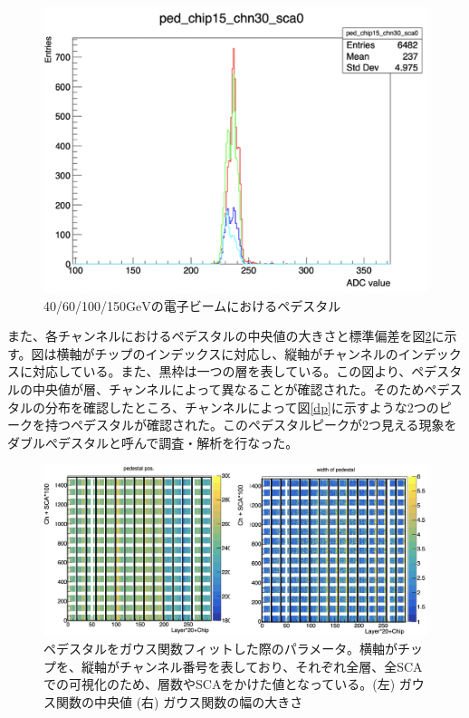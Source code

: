 \begin{figure}[H]
\begin{center}
 \includegraphics[keepaspectratio, scale=0.3]
 	{Figure/Beamtest/pedestal.png}
 		\caption{40/60/100/150$\mathrm{GeV}$の電子ビームにおけるペデスタル}
		\label{pedestal}
\end{center}
\end{figure}
また、各チャンネルにおけるペデスタルの中央値の大きさと標準偏差を図\ref{means}に示す。図は横軸がチップのインデックスに対応し、縦軸がチャンネルのインデックスに対応している。また、黒枠は一つの層を表している。この図より、ペデスタルの中央値が層、チャンネルによって異なることが確認された。そのためぺデスタルの分布を確認したところ、チャンネルによって図\ref{dp}に示すような2つのピークを持つペデスタルが確認された。このペデスタルピークが2つ見える現象をダブルぺデスタルと呼んで調査・解析を行なった。
\begin{figure}[H]
\begin{center}
 \includegraphics[keepaspectratio, scale=0.3]
 	{Figure/Beamtest/ped_pos.png}
 		\caption{ペデスタルをガウス関数フィットした際のパラメータ。横軸がチップを、縦軸がチャンネル番号を表しており、それぞれ全層、全SCAでの可視化のため、層数やSCAをかけた値となっている。(左) ガウス関数の中央値 (右) ガウス関数の幅の大きさ}
		\label{means}
\end{center}
\end{figure}

